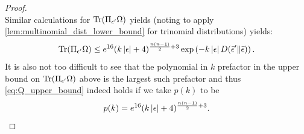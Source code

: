 \documentclass[notitlepage, 10pt]{article}
\begin{document}
\begin{proof}
\begin{equation}
    \end{equation}
    Similar calculations for $\operatorname{Tr}(\Pi_{\epsilon'} \Omega)$ yields (noting to apply \cref{lem:multinomial_dist_lower_bound} for trinomial distributions) yields:
    \begin{equation}
        \operatorname{Tr}(\Pi_{\epsilon'} \Omega) \leq e^{16}(k\left|\epsilon\right|+4)^{\frac{n(n-1)}{2}+3}\exp\left(-k\left|\epsilon\right|D\!\left(\bar \epsilon'\middle\|\bar \epsilon\right)\right).
    \end{equation}
    It is also not too difficult to see that the polynomial in $k$ prefactor in the upper bound on $\operatorname{Tr}(\Pi_{\epsilon'} \Omega)$ above is the largest such prefactor and thus \cref{eq:Q_upper_bound} indeed holds if we take $p(k)$ to be
    \begin{equation}
        \label{eq:p_of_k}
        p(k) = e^{16}(k\left|\epsilon\right|+4)^{\frac{n(n-1)}{2}+3}.
    \end{equation}
\end{proof}
\end{document}
